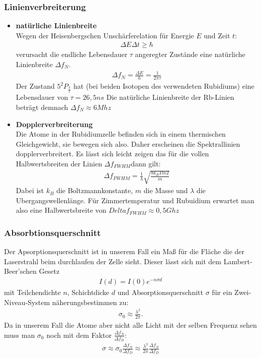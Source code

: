 \documentclass[12pt]{article}
\begin{document}
\subsubsection{Linienverbreiterung}
\begin{itemize}
 \item \textbf{natürliche Linienbreite} \\
    Wegen der Heisenbergschen Unschärferelation für Energie $E$ und Zeit $t$:
    \begin{align*}
    \Delta E \Delta t \geq \hbar
    \end{align*}
    verursacht die endliche Lebensdauer $\tau$ angeregter Zustände eine natürliche Linienbreite $\Delta f_N$.
    \begin{align}
    \label{natbreite}
    \Delta f_N  = \frac{\Delta E}{h} = \frac{1}{2 \pi \tau}
    \end{align}
    Der Zustand $5^2P_{\frac{3}{2}}$ hat (bei beiden Isotopen des verwendeten Rubidiums) eine Lebensdauer von $\tau =26,5 ns$
    Die natürliche Linienbreite der Rb-Linien beträgt demnach $\Delta f_N \approx 6 Mhz$
 \item \textbf{Dopplerverbreiterung} \\
    Die Atome in der Rubidiumzelle befinden sich in einem thermischen Gleichgewicht, sie bewegen sich also. Daher erscheinen die Spektrallinien dopplerverbreitert. Es lässt sich leicht zeigen das für die vollen Halbwertsbreiten der Linien $\Delta f_{FWHM}$dann gilt:
    \begin{align}
    \label{FWHM}
     \Delta f_{FWHM} = \frac{1}{\lambda} \sqrt{\frac{8 k_B T ln 2}{m}}
    \end{align}
    Dabei ist $k_B$ die Boltzmannkonstante, $m$ die Masse und $\lambda$ die Ubergangswellenlänge.
Für Zimmertemperatur und Rubuidium erwartet man also eine Halbwertsbreite von $Delta f_{FWHM} \approx 0,5 Ghz$
\end{itemize}

\subsubsection{Absorbtionsquerschnitt}
Der Apsorptionsquerschnitt ist in unserem Fall ein Maß für die Fläche die der Laserstrahl beim durchlaufen der Zelle sieht.
Dieser lässt sich mit dem Lambert-Beer'schen Gesetz 
\begin{align}
 I(d) = I(0) e^{-n \sigma d}
 \label{lambert}
\end{align}
mit Teilchendichte $n$, Schichtdicke $d$ und Absorptionsquerschnitt $\sigma$
für ein Zwei-Niveau-System näherungsbestimmen zu:
\begin{align}
 \sigma_0 \approx \frac{\lambda^2}{2\pi}.
\end{align}
Da in unserem Fall die Atome aber nicht alle Licht mit der selben Frequenz sehen muss man $\sigma_0$ noch mit dem Faktor $\frac{\Delta f_N}{\Delta f_D}$:
\begin{align}
 \sigma \approx \sigma_0 \frac{\Delta f_N}{\Delta f_D} \approx \frac{\lambda^2}{2\pi}\frac{\Delta f_N}{\Delta f_D}
\end{align}
\end{document}
